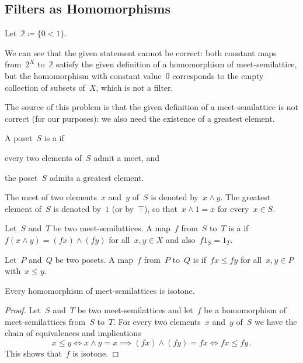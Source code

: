 \subsection{Filters as Homomorphisms}

Let~$𝟚 ≔ \{ 0 < 1 \}$.

We can see that the given statement cannot be correct:
both constant maps from~$2^X$ to~$𝟚$ satisfy the given definition of a homomorphism of meet-semilattice, but the homomorphism with constant value~$0$ corresponds to the empty collection of subsets of~$X$, which is not a filter.

The source of this problem is that the given definition of a meet-semilattice is not correct (for our purposes):
we also need the existence of a greatest element.

\begin{definition}
	A poset~$S$ is a  if
	\begin{enumerate*}
%
		\item
			every two elements of~$S$ admit a meet, and
%
		\item
			the poset~$S$ admits a greatest element.

	\end{enumerate*}
	The meet of two elements~$x$ and~$y$ of~$S$ is denoted by~$x ∧ y$.
	The greatest element of~$S$ is denoted by~$1$ (or by~$⊤$), so that~$x ∧ 1 = x$ for every~$x ∈ S$.
\end{definition}

\begin{definition}
	Let~$S$ and~$T$ be two meet-semilattices.
	A map~$f$ from~$S$ to~$T$ is a  if~$f (x ∧ y) = (f x) ∧ (f y)$ for all~$x, y ∈ X$ and also~$f 1_S = 1_T$.
\end{definition}

\begin{definition}
	Let~$P$ and~$Q$ be two posets.
	A map~$f$ from~$P$ to~$Q$ is  if~$f x ≤ f y$ for all~$x, y ∈ P$ with~$x ≤ y$.
\end{definition}

\begin{proposition}
	Every homomorphism of meet-semilattices is isotone.
\end{proposition}

\begin{proof}
	Let~$S$ and~$T$ be two meet-semilattices and let~$f$ be a homomorphism of meet-semilattices from~$S$ to~$T$.
	For every two elements~$x$ and~$y$ of~$S$ we have the chain of equivalences and implications
	\[
		x ≤ y
		\iff
		x ∧ y = x
		\implies
		(f x) ∧ (f y) = f x
		\iff
		f x ≤ f y \,.
	\]
	This shows that~$f$ is isotone.
\end{proof}

